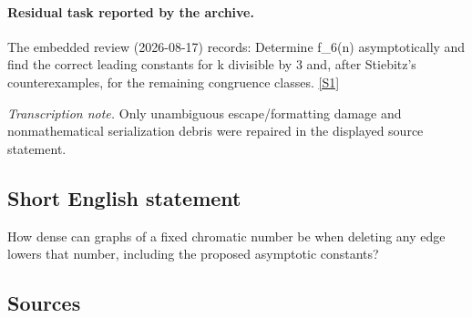 \documentclass[11pt,a4paper]{article}
\newcommand{\sref}[2]{\hyperlink{source:#1:#2}{[S#2]}}
\begin{document}
\paragraph{Residual task reported by the archive.}

The embedded review (2026-08-17) records: Determine f\_6(n) asymptotically and find the correct leading constants for k divisible by 3 and, after Stiebitz's counterexamples, for the remaining congruence classes. \sref{2380}{1}

{\small\emph{Transcription note.} Only unambiguous escape/formatting damage and nonmathematical serialization debris were repaired in the displayed source statement.}

\subsection{Short English statement}

How dense can graphs of a fixed chromatic number be when deleting any edge lowers that number, including the proposed asymptotic constants?

\subsection{Sources}
\end{document}
